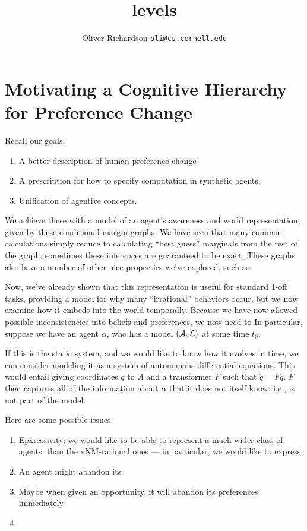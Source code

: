 \documentclass{article}
\title{levels}
\author{Oliver Richardson  \texttt{oli@cs.cornell.edu}}
\begin{document}

	\section{Motivating a Cognitive Hierarchy for Preference Change}
	Recall our goals:
	\begin{enumerate}[nosep]
		\item A better description of human preference change
		\item A prescription for how to specify computation in synthetic agents.
		\item Unification of agentive concepts.
	\end{enumerate}
	
	We achieve these with a model of an agent's awareness and world representation, given by these conditional margin graphs. We have seen that many common calculations simply reduce to calculating ``best guess'' marginals from the rest of the graph; sometimes these inferences are guaranteed to be exact. These graphs also have a number of other nice properties we've explored, such as: \todo{}
	
	Now, we've already shown that this representation is useful for standard 1-off tasks, providing a model for why many ``irrational'' behaviors occur, but we now examine how it embeds into the world temporally. Because we have now allowed possible inconsistencies into beliefs and preferences, we now need to  In particular, suppose we have an agent $\alpha$, who has a model $(\cal A, L)$ at some time $t_0$.
	
	
	If this is the static system, and we would like to know how it evolves in time, we can consider modeling it as a system of autonomous differential equations. This would entail giving coordinates $q$ to $A$ and a transformer $F$ such that $\dot q = F q$. $F$ then captures all of the information about $\alpha$ that it does not itself know, i.e., is not part of the model.
	
	
	Here are some possible issues:
	\begin{enumerate}
		\item Epxressivity: we would like to be able to represent a much wider class of agents, than the vNM-rational ones --- in particular, we would like to express. 
		
		\item An agent might abandon its
		
		\item Maybe when given an opportunity, it will abandon its preferences immediately
		\item 
		
	\end{enumerate}
	
\end{document}
